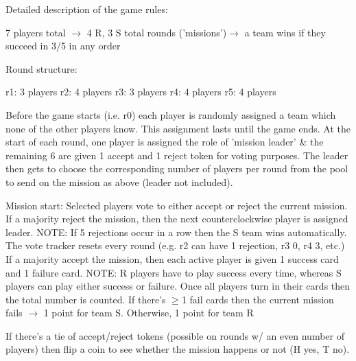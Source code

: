 \documentclass[pdftex,10pt,a4paper]{article}
\numberwithin{equation}{section} %
\begin{document}
Detailed description of the game rules:

7 players total $\rightarrow$ 4 R, 3 S\newline
{} total rounds ('missions')$\rightarrow$ a team wins if they succeed in 3/5 in any order\newline

Round structure:

\indent r1: 3 players \newline
\indent	r2: 4 players \newline
\indent	r3: 3 players \newline
\indent	r4: 4 players \newline
\indent	r5: 4 players \newline


Before the game starts (i.e. r0) each player is randomly assigned a team which none of the other players know. This assignment lasts until the game ends.
At the start of each round, one player is assigned the role of 'mission leader' \& the remaining 6 are given 1 accept and 1 reject token for voting purposes. The leader then gets to choose the corresponding number of players per round from the pool to send on the mission as above (leader not included).\newline

Mission start:\newline \newline
\indent Selected players vote to either accept or reject the current mission. \newline
\indent If a majority reject the mission, then the next counterclockwise player is \indent assigned leader. NOTE: If 5 rejections occur in a row then the S team \indent wins automatically. The vote tracker resets every round (e.g. r2 can have 1 \indent rejection, r3 0, r4 3, etc.)\newline
\indent If a majority accept the mission, then each active player is given 1 success \indent card and 1 failure card. NOTE: R players have to play success every time, \indent whereas S players can play either success or failure. Once all players turn in \indent their cards then the total number is counted. If there's $\ge$1 fail cards then \indent the current mission fails $\rightarrow$ 1 point for team S. Otherwise, 1 point for team R \newline

\indent If there's a tie of accept/reject tokens (possible on rounds w/ an even \indent number of players) then flip a coin to see whether the mission happens or \indent not (H  yes, T no).\newline 
\end{document}
